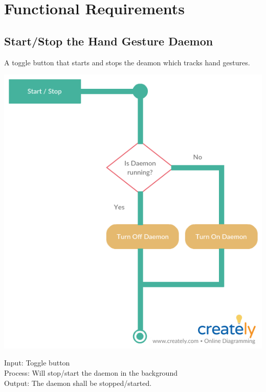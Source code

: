 \documentclass{scrreprt}
\begin{document}
\chapter{Functional Requirements}
\section{Start/Stop the Hand Gesture Daemon}
A toggle button that starts and stops the deamon which tracks hand gestures.
\begin{center}
    \includegraphics[scale=0.5]{start.png}
\end{center}
Input: Toggle button
\\Process: Will stop/start the daemon in the background
\\Output: The daemon shall be stopped/started.

\newpage
\end{document}
